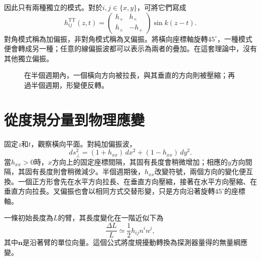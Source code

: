 因此只有兩種獨立的模式。對於\(i,j\in\{x,y\}\)，可將它們寫成
\begin{equation}
 h^{\mathrm{TT}}_{ij}(z,t)
 =
 \begin{pmatrix}
 h_+ & h_\times\\
 h_\times & -h_+
 \end{pmatrix}
 \sin k(z-t).
 \label{eq:polarization-matrix}
\end{equation}
對角模式稱為加偏振，非對角模式稱為叉偏振。將橫向座標軸旋轉\(45^\circ\)，一種模式便會轉成另一種；任意的線偏振波都可以表示為兩者的疊加。在這套理論中，沒有其他獨立偏振。

\begin{figure}[htbp]
\centering
{}
\caption{在半個週期內，一個橫向方向被拉長，與其垂直的方向則被壓縮；再過半個週期，形變便反轉。}
\end{figure}

\section{從度規分量到物理應變}

固定\(z\)和\(t\)，觀察橫向平面。對純加偏振波，
\begin{equation}
 ds_\perp^2
 =(1+h_{xx})\,dx^2+(1-h_{xx})\,dy^2.
 \label{eq:transverse-distance}
\end{equation}
當\(h_{xx}>0\)時，\(x\)方向上的固定座標間隔，其固有長度會稍微增加；相應的\(y\)方向間隔，其固有長度則會稍微減少。半個週期後，\(h_{xx}\)改變符號，兩個方向的變化便互換。一個正方形會先在水平方向拉長、在垂直方向壓縮，接著在水平方向壓縮、在垂直方向拉長。叉偏振也會以相同方式交替形變，只是方向沿著旋轉\(45^\circ\)的座標軸。

一條初始長度為\(L\)的臂，其長度變化在一階近似下為
\begin{equation}
 \frac{\Delta L}{L}\simeq\frac12 h_{ij}n^i n^j,
 \label{eq:fractional-strain}
\end{equation}
其中\(\mathbf n\)是沿著臂的單位向量。這個公式將度規擾動轉換為探測器量得的無量綱應變。

